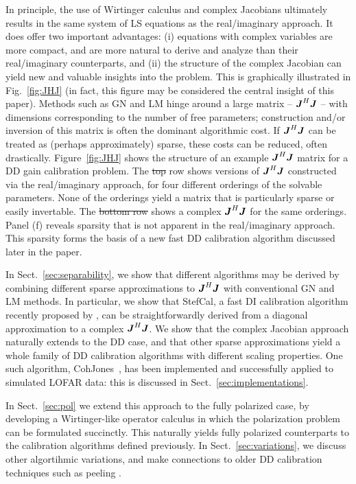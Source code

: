\documentclass[useAMS,usenatbib]{mn2e}
\newcommand{\mat}[1]{{\bmath{#1}}}
\newcommand{\JJ}{\mat{J}} %
\newcommand{\JHJ}{\JJ^H\JJ} %
\newcommand{\COH}{{\sc CohJones}}
\newcommand{\StefCal}{{\sc StefCal}}
\numberwithin{equation}{section} %
\providecommand{\DIFadd}[1]{{\protect\color{blue}\uwave{#1}}} %
\providecommand{\DIFdel}[1]{{\protect\color{red}\sout{#1}}}                      %
\providecommand{\DIFaddbegin}{} %
\providecommand{\DIFaddend}{} %
\providecommand{\DIFdelbegin}{} %
\providecommand{\DIFdelend}{} %
\begin{document}
In principle, the use of Wirtinger calculus and complex Jacobians ultimately results in the same system of LS 
equations as the real/imaginary approach. It does offer two important advantages: (i) equations with complex variables 
are more compact, and are more natural to derive and analyze than their real/imaginary counterparts, and (ii) the structure of the
complex Jacobian can yield new and valuable insights into the problem. This is graphically illustrated in 
Fig.~\ref{fig:JHJ} (in fact, this figure may be considered the central insight of this paper). Methods such as 
GN and LM hinge around a large matrix -- $\JHJ$ -- with dimensions corresponding to the number of 
free parameters; construction and/or inversion of this matrix is often the dominant algorithmic cost. If $\JHJ$ can
be treated as (perhaps approximately) sparse, these costs can be reduced, often drastically. Figure~\ref{fig:JHJ} 
shows the structure of an example $\JHJ$ matrix for a DD gain calibration problem. The \DIFdelbegin \DIFdel{top }\DIFdelend \DIFaddbegin \DIFadd{left column }\DIFaddend row shows versions of
$\JHJ$ constructed via the real/imaginary approach, for four different orderings of the solvable parameters. None of
the orderings yield a matrix that is particularly sparse or easily invertable. The \DIFdelbegin \DIFdel{bottom row }\DIFdelend \DIFaddbegin \DIFadd{right column }\DIFaddend shows a 
complex $\JHJ$ for the same orderings. Panel (f) reveals sparsity that is not apparent in the real/imaginary 
approach. This sparsity forms the basis of a new fast DD calibration algorithm discussed later in the paper.

In Sect.~\ref{sec:separability}, we show that different algorithms may be derived by combining 
different sparse approximations to $\JHJ$ with conventional GN and LM methods.  In particular, we show 
that \StefCal, a fast DI calibration algorithm recently proposed by \citet{Stefcal},
can be straightforwardly derived from a diagonal approximation to a complex $\JHJ$. We show that the 
complex Jacobian approach naturally extends to the DD case, and that other sparse approximations yield a whole family
of DD calibration algorithms with different scaling properties. One such algorithm, \COH\ \citep{Tasse-cohjones}, has been implemented 
and successfully applied to simulated LOFAR data: this is discussed in Sect.~\ref{sec:implementations}.

In Sect.~\ref{sec:pol} we extend this approach to the fully polarized case, by developing a Wirtinger-like 
operator calculus in which the polarization problem can be formulated succinctly. This naturally yields 
fully polarized counterparts to the calibration algorithms defined previously. In Sect.~\ref{sec:variations}, 
we discuss other algortihmic variations, and make connections to older DD calibration techniques such as 
peeling \citep{JEN:peeling}. 
\end{document}
